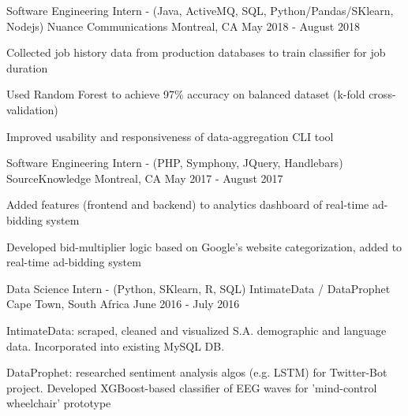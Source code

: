 


\begin{cventries}


\cventry
{Software Engineering Intern - (Java, ActiveMQ, SQL, Python/Pandas/SKlearn, Nodejs)} %
{Nuance Communications} %
{Montreal, CA} %
{May 2018 - August 2018} %
{ %
\begin{cvitems}
\item {Collected job history data from production databases to train classifier for job duration}
\item {Used Random Forest to achieve 97\% accuracy on balanced dataset (k-fold cross-validation)}
\item {Improved usability and responsiveness of data-aggregation CLI tool}
\end{cvitems}
}


\cventry
{Software Engineering Intern - (PHP, Symphony, JQuery, Handlebars)} %
{SourceKnowledge} %
{Montreal, CA} %
{May 2017 - August 2017} %
{ %
\begin{cvitems}
\item {Added features (frontend and backend) to analytics dashboard of real-time ad-bidding system}
\item {Developed bid-multiplier logic based on Google's website categorization, added to real-time ad-bidding system}
\end{cvitems}
}


\cventry
{Data Science Intern - (Python, SKlearn, R, SQL)} %
{IntimateData / DataProphet} %
{Cape Town, South Africa} %
{June 2016 - July 2016} %
{ %
\begin{cvitems}
\item {IntimateData: scraped, cleaned and visualized S.A. demographic and language data. Incorporated into existing MySQL DB.}
\item {DataProphet: researched sentiment analysis algos (e.g. LSTM) for Twitter-Bot project. Developed XGBoost-based classifier of EEG waves for 'mind-control wheelchair' prototype}
\end{cvitems} 
}


\end{cventries}
